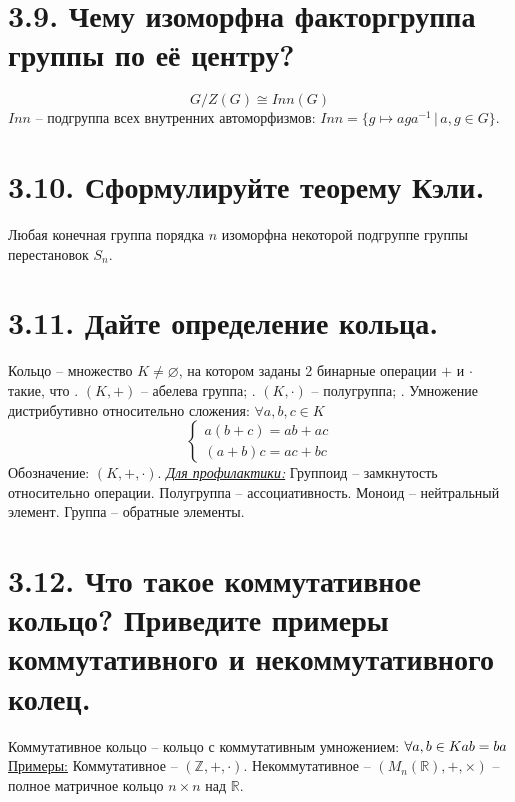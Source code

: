 \documentclass{article}
\begin{document}
\section*{\LARGE 3.9. Чему изоморфна факторгруппа группы по её центру? }
$$G/Z(G) \cong Inn(G)$$
$Inn$ -- подгруппа всех внутренних автоморфизмов: $Inn = \{g \mapsto aga^{-1}\,|\, a,g \in G\}$.

\section*{\LARGE 3.10. Сформулируйте теорему Кэли. }
Любая конечная группа порядка $n$ изоморфна некоторой подгруппе группы перестановок $S_n$.

\section*{\LARGE 3.11. Дайте определение кольца. }
Кольцо -- множество $K \ne \varnothing$, на котором заданы 2 бинарные операции $+$ и $\cdot$ такие, что
\newline{}. $(K, +)$ -- абелева группа;
\newline{}. $(K, \cdot)$ -- полугруппа;
\newline{}. Умножение дистрибутивно относительно сложения: $\forall a,b,c \in K$
$$
\begin{cases}
a(b + c) = ab + ac \\
(a + b)c = ac + bc 
\end{cases}
$$
Обозначение: $(K, +, \cdot)$.
\newline \underline{\textit{Для профилактики:}}
\newline Группоид -- замкнутость относительно операции.
\newline Полугруппа -- ассоциативность.
\newline Моноид -- нейтральный элемент.
\newline Группа -- обратные элементы.

\section*{\LARGE 3.12. Что такое коммутативное кольцо? Приведите примеры коммутативного и некоммутативного колец. }
Коммутативное кольцо -- кольцо с коммутативным умножением: $\forall a,b \in K \newline ab = ba$
\newline \underline{Примеры:}
\newline Коммутативное -- $(\mathbb{Z}, +, \cdot)$.
\newline Некоммутативное -- $(M_n(\mathbb{R}), +, \times)$ -- полное матричное кольцо $n\times n$ над $\mathbb{R}$.
\end{document}
